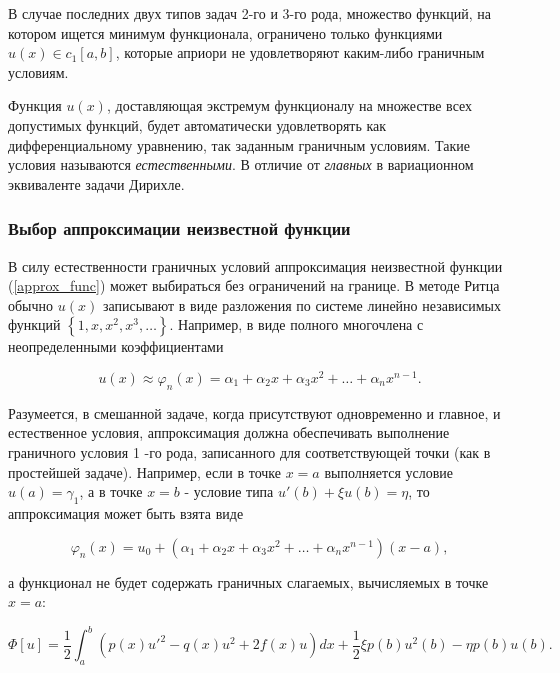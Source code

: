\documentclass{article}
\begin{document}
В случае последних двух типов задач 2-го и 3-го рода, множество функций, на котором ищется минимум функционала, ограничено только функциями $u(x) \in c_{1}\left[a, b\right] $, которые априори не удовлетворяют каким-либо граничным условиям. 

\begin{warn}[Важно!]
	Функция $u(x)$, доставляющая экстремум функционалу на множестве всех допустимых функций, будет автоматически удовлетворять как дифференциальному уравнению, так заданным граничным условиям. Такие условия называются \textit{естественными}. В отличие от \textit{главных} в вариационном эквиваленте задачи Дирихле.
\end{warn}

\subsubsection{Выбор аппроксимации неизвестной функции}

В силу естественности граничных условий аппроксимация неизвестной функции (\ref{approx_func}) может выбираться без ограничений на границе. В методе Ритца обычно $u(x)$ записывают в виде разложения по системе линейно независимых функций $\left\{ 1, x, x^{2}, x^{3}, \dots \right\}$. Например, в виде полного многочлена с неопределенными коэффициентами

\begin{displaymath}
	u(x) \approx \varphi_{n}(x) = \alpha_{1} + \alpha_{2}x + \alpha_{3}x^{2} + \dots + \alpha_{n}x^{n-1}.
\end{displaymath}

Разумеется, в смешанной задаче, когда присутствуют одновременно и главное, и естественное условия, аппроксимация должна обеспечивать выполнение граничного условия 1 -го рода, записанного для соответствующей точки (как в простейшей задаче). Например, если в точке $x = a$ выполняется условие $u(a) = \gamma_{1}$, а в точке $x = b$ - условие типа $u'(b) + \xi u(b) = \eta$, то аппроксимация может быть взята виде

\begin{displaymath}
	\varphi_{n}(x) = u_{0} + \left( \alpha_{1} + \alpha_{2}x + \alpha_{3}x^{2} + \dots + \alpha_{n}x^{n-1} \right) \left( x - a \right),
\end{displaymath}

\noindent а функционал не будет содержать граничных слагаемых, вычисляемых в точке $x = a$:

\begin{displaymath}
	\Phi[u] = \frac{1}{2} \int_{a}^{b} \left( p(x)u'^{2} - q(x)u^{2} + 2f(x)u \right)dx + \frac{1}{2} \xi p(b) u^{2}(b) - \eta p(b)u(b).
\end{displaymath}
\end{document}

